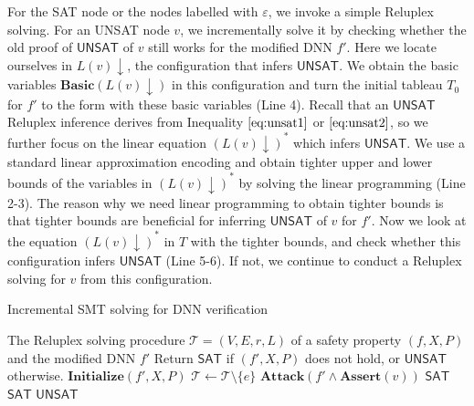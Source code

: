 \documentclass[runningheads]{llncs}
\begin{document}
 For the SAT node or the nodes labelled with $\varepsilon$, we invoke a simple Reluplex solving. For an UNSAT node $v$, we incrementally solve it by checking whether the old proof of $\mathsf{UNSAT}$ of $v$ still works for the modified DNN $f'$. 
 Here we locate ourselves in $L(v) \downarrow$, the configuration that infers $\mathsf{UNSAT}$. We obtain the basic variables $\mathbf{Basic}(L(v) \downarrow)$ in this configuration and turn the initial tableau $T_0$ for $f'$ to the form with these basic variables (Line 4). Recall that an $\mathsf{UNSAT}$ Reluplex inference derives from Inequality $\eqref{eq:unsat1}$ or $\eqref{eq:unsat2}$, so we further focus on the linear equation $(L(v) \downarrow)^*$ which infers $\mathsf{UNSAT}$. We use a standard linear approximation encoding and obtain tighter upper and lower bounds of the variables in $(L(v) \downarrow)^*$ by solving the linear programming (Line 2-3). The reason why we need linear programming to obtain tighter bounds is that tighter bounds are beneficial for inferring $\mathsf{UNSAT}$ of $v$ for $f'$. Now we look at the equation $(L(v) \downarrow)^*$ in $T$ with the tighter bounds, and check whether this configuration infers $\mathsf{UNSAT}$ (Line 5-6). If not, we continue to conduct a Reluplex solving for $v$ from this configuration.

\begin{algorithm}[t]
    \caption{Incremental SMT solving for DNN verification}
    \label{Alg:main}
    \begin{algorithmic}[1]
        \Require
        \Statex  The Reluplex solving procedure $\mathcal T=(V,E,r,L)$ of a safety property $(f,X,P)$ and the modified DNN $f'$
        \Ensure
        \Statex Return $\mathsf{SAT}$ if $(f',X,P)$ does not hold, or $\mathsf{UNSAT}$ otherwise.
            \State  $\mathbf{Initialize}(f',X,P)$ 
                 $\mathcal T \gets \mathcal T \setminus \{e\}$
                \EndIf
              \EndFor
            \State $\mathbf{Attack}(f' \wedge \mathbf{Assert}(v))$ 
             \Return $\mathsf{SAT}$ 
            \EndIf
            \EndIf
               
             \Return $\mathsf{SAT}$ 
            \EndIf
            \EndFor
     \State \Return $\mathsf{UNSAT}$ 
       \EndFunction
\end{algorithmic}\end{algorithm}
\end{document}
